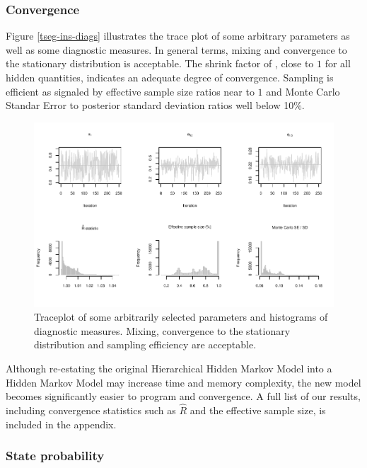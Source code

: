 \documentclass[]{article}
\begin{document}
\normalsize

\subsubsection{Convergence}\label{convergence}

Figure \ref{tseg-ins-diags} illustrates the trace plot of some arbitrary
parameters as well as some diagnostic measures. In general terms, mixing
and convergence to the stationary distribution is acceptable. The shrink
factor of \citep{gelman1992inference}, close to \(1\) for all hidden
quantities, indicates an adequate degree of convergence. Sampling is
efficient as signaled by effective sample size ratios near to \(1\) and
Monte Carlo Standar Error to posterior standard deviation ratios well
below 10\%.

\begin{figure}[H]
\includegraphics[width=\textwidth]{main_files/figure-latex/unnamed-chunk-11-1} \caption{Traceplot of some arbitrarily selected parameters and histograms of diagnostic measures. Mixing, convergence to the stationary distribution and sampling efficiency are acceptable.\label{tseg-ins-diags}}\label{fig:unnamed-chunk-11}
\end{figure}

Although re-estating the original Hierarchical Hidden Markov Model into
a Hidden Markov Model may increase time and memory complexity, the new
model becomes significantly easier to program and convergence. A full
list of our results, including convergence statistics such as
\(\hat{R}\) and the effective sample size, is included in the appendix.

\subsubsection{State probability}\label{state-probability}
\end{document}

